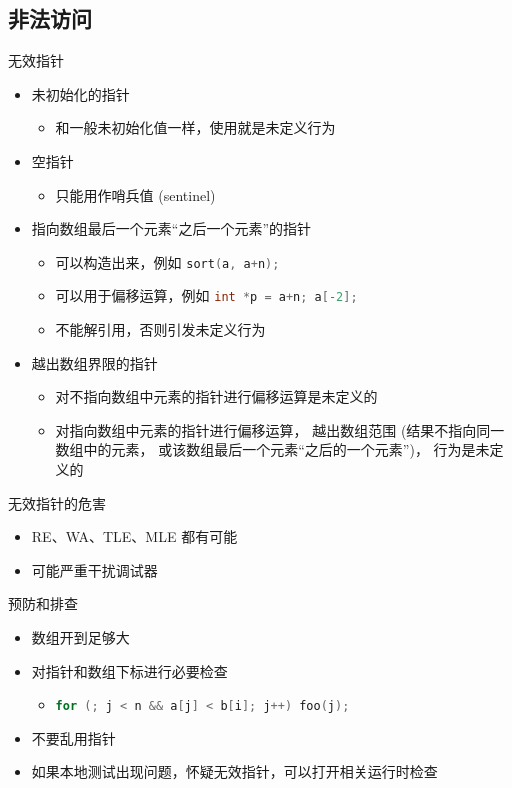 \documentclass[10pt,mathserif]{beamer}
\begin{document}
\subsection{非法访问}
\begin{frame}{无效指针}
	\begin{itemize}
		\item 未初始化的指针
			\begin{itemize}
				\item 和一般未初始化值一样，使用就是未定义行为
			\end{itemize}
		\item 空指针
			\begin{itemize}
				\item 只能用作哨兵值 (sentinel)
			\end{itemize}
		\item 指向数组最后一个元素“之后一个元素”的指针
			\begin{itemize}
				\item 可以构造出来，例如
					\lstinline[language=C++]!sort(a, a+n);!
				\item 可以用于偏移运算，例如
					\lstinline[language=C++]!int *p = a+n; a[-2];!
				\item 不能解引用，否则引发未定义行为
			\end{itemize}
		\item 越出数组界限的指针
			\begin{itemize}
				\item 对不指向数组中元素的指针进行偏移运算是未定义的
				\item 对指向数组中元素的指针进行偏移运算，
					越出数组范围 (结果不指向同一数组中的元素，
					或该数组最后一个元素“之后的一个元素”)，
					行为是未定义的
			\end{itemize}
	\end{itemize}
\end{frame}

\begin{frame}{无效指针的危害}
	\begin{itemize}
		\item RE、WA、TLE、MLE 都有可能
		\item 可能严重干扰调试器
	\end{itemize}
\end{frame}

\begin{frame}{预防和排查}
	\begin{itemize}
		\item 数组开到足够大
		\item 对指针和数组下标进行必要检查
			\begin{itemize}
				\item
\lstinline[language=C++]!for (; j < n && a[j] < b[i]; j++) foo(j);!
			\end{itemize}
		\item 不要乱用指针
		\item 如果本地测试出现问题，怀疑无效指针，可以打开相关运行时检查
	\end{itemize}
\end{frame}
\end{document}
